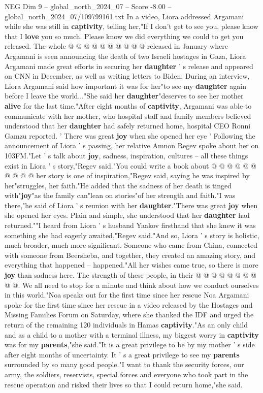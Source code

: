 \begin{textsample}{NEG Dim 9 – global\_north\_2024\_07 – Score -8.00 – global\_north\_2024\_07/109799161.txt}
In a video, Liora addressed Argamani while she was still in \textbf{captivity}, telling her,"If I don't get to see you, please know that I \textbf{love} you so much.
Please know we did everything we could to get you released.
The whole @ @ @ @ @ @ @ @ @ @ released in January where Argamani is seen announcing the death of two Israeli hostages in Gaza, Liora Argamani made great efforts in securing her \textbf{daughter} ' s release and appeared on CNN in December, as well as writing letters to Biden.
During an interview, Liora Argamani said how important it was for her"to see my \textbf{daughter} again before I leave the world..."She said her \textbf{daughter}"deserves to see her mother \textbf{alive} for the last time."After eight months of \textbf{captivity}, Argamani was able to communicate with her mother, who hospital staff and family members believed understood that her \textbf{daughter} had safely returned home, hospital CEO Ronni Gamzu reported. ' There was great \textbf{joy} when she opened her eye ' Following the announcement of Liora ' s passing, her relative Amnon Regev spoke about her on 103FM."Let ' s talk about \textbf{joy}, sadness, inspiration, cultures -- all these things exist in Liora ' s story,"Regev said."You could write a book about @ @ @ @ @ @ @ @ @ @ her story is one of inspiration,"Regev said, saying he was inspired by her"struggles, her faith."He added that the sadness of her death is tinged with"\textbf{joy}"as the family can"lean on stories"of her strength and faith."I was there,"he said of Liora ' s reunion with her \textbf{daughter}."There was great \textbf{joy} when she opened her eyes.
Plain and simple, she understood that her \textbf{daughter} had returned.""I heard from Liora ' s husband Yaakov firsthand that she knew it was something she had eagerly awaited,"Regev said."And so, Liora ' s story is holistic, much broader, much more significant.
Someone who came from China, connected with someone from Beersheba, and together, they created an amazing story, and everything that happened -- happened."All her wishes came true, so there is more \textbf{joy} than sadness here.
The strength of these people, in their @ @ @ @ @ @ @ @ @ @.
We all need to stop for a minute and think about how we conduct ourselves in this world."Noa speaks out for the first time since her rescue Noa Argamani spoke for the first time since her rescue in a video released by the Hostages and Missing Families Forum on Saturday, where she thanked the IDF and urged the return of the remaining 120 individuals in Hamas \textbf{captivity}."As an only child and as a child to a mother with a terminal illness, my biggest worry in \textbf{captivity} was for my \textbf{parents},"she said."It is a great privilege to be by my mother ' s side after eight months of uncertainty.
It ' s a great privilege to see my \textbf{parents} surrounded by so many good people."I want to thank the security forces, our army, the soldiers, reservists, special forces and everyone who took part in the rescue operation and risked their lives so that I could return home,"she said.

\end{textsample}
